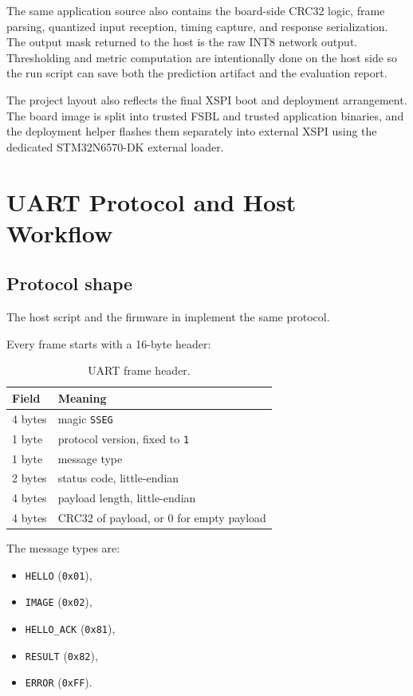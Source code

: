 \documentclass[11pt,a4paper]{article}
\begin{document}
The same application source also contains the board-side CRC32 logic, frame parsing,
quantized input reception, timing capture, and response serialization. The output mask
returned to the host is the raw INT8 network output. Thresholding and metric computation
are intentionally done on the host side so the run script can save both the prediction
artifact and the evaluation report.

The project layout also reflects the final XSPI boot and deployment arrangement. The
board image is split into trusted FSBL and trusted application binaries, and the
deployment helper flashes them separately into external XSPI using the dedicated
STM32N6570-DK external loader.

\section{UART Protocol and Host Workflow}

\subsection{Protocol shape}

The host script  and the firmware
in  implement the same protocol.

Every frame starts with a 16-byte header:

\begin{table}[H]
\centering
\caption{UART frame header.}
\begin{tabular}{ll}
\toprule
Field & Meaning \\
\midrule
4 bytes & magic \texttt{SSEG} \\
1 byte & protocol version, fixed to \texttt{1} \\
1 byte & message type \\
2 bytes & status code, little-endian \\
4 bytes & payload length, little-endian \\
4 bytes & CRC32 of payload, or 0 for empty payload \\
\bottomrule
\end{tabular}
\end{table}

The message types are:

\begin{itemize}
\item \texttt{HELLO} (\texttt{0x01}),
\item \texttt{IMAGE} (\texttt{0x02}),
\item \texttt{HELLO\_ACK} (\texttt{0x81}),
\item \texttt{RESULT} (\texttt{0x82}),
\item \texttt{ERROR} (\texttt{0xFF}).
\end{itemize}
\end{document}

